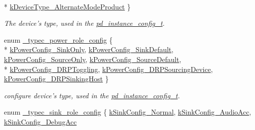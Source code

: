 \begin{DoxyCompactItemize}
\\*
\hyperlink{group__usb__pd__stack_gga922338772b41ceba51f7881c74b9e20aa529a07dcc02eddbe7318fb5d98d6d9a8}{k\-Device\-Type\-\_\-\-Alternate\-Mode\-Product}
 \}
\begin{DoxyCompactList}\small\item\em The device's type, used in the \hyperlink{group__usb__pd__stack_gafa6034f9e204836697da1f2fc996cbad}{pd\-\_\-instance\-\_\-config\-\_\-t}. \end{DoxyCompactList}\item 
enum \hyperlink{group__usb__pd__stack_gaffef947540aace08ecf6fd25f69720a9}{\-\_\-typec\-\_\-power\-\_\-role\-\_\-config} \{ \\*
\hyperlink{group__usb__pd__stack_ggaffef947540aace08ecf6fd25f69720a9a437645be6176b52731290288dfdb65de}{k\-Power\-Config\-\_\-\-Sink\-Only}, 
\hyperlink{group__usb__pd__stack_ggaffef947540aace08ecf6fd25f69720a9aff4b2380c8b265bbbe69d2eaa1ab207c}{k\-Power\-Config\-\_\-\-Sink\-Default}, 
\hyperlink{group__usb__pd__stack_ggaffef947540aace08ecf6fd25f69720a9a38da91c9c7115f0e6866a557601ad9b0}{k\-Power\-Config\-\_\-\-Source\-Only}, 
\hyperlink{group__usb__pd__stack_ggaffef947540aace08ecf6fd25f69720a9a9656266d9665fce5cad114863e549798}{k\-Power\-Config\-\_\-\-Source\-Default}, 
\\*
\hyperlink{group__usb__pd__stack_ggaffef947540aace08ecf6fd25f69720a9a9b59768282ea23a087cc0912e4516cae}{k\-Power\-Config\-\_\-\-D\-R\-P\-Toggling}, 
\hyperlink{group__usb__pd__stack_ggaffef947540aace08ecf6fd25f69720a9a2669bea019494464b15f2a4e4904d385}{k\-Power\-Config\-\_\-\-D\-R\-P\-Sourcing\-Device}, 
\hyperlink{group__usb__pd__stack_ggaffef947540aace08ecf6fd25f69720a9aba8782be77976d2ffc9830f1106e80f3}{k\-Power\-Config\-\_\-\-D\-R\-P\-Sinking\-Host}
 \}
\begin{DoxyCompactList}\small\item\em configure device's type, used in the \hyperlink{group__usb__pd__stack_gafa6034f9e204836697da1f2fc996cbad}{pd\-\_\-instance\-\_\-config\-\_\-t}. \end{DoxyCompactList}\item 
enum \hyperlink{group__usb__pd__stack_ga6ba6df5e492767ce7ac52bafddd8849d}{\-\_\-typec\-\_\-sink\-\_\-role\-\_\-config} \{ \hyperlink{group__usb__pd__stack_gga6ba6df5e492767ce7ac52bafddd8849da6fac5bc0fce029f255189bbe5182577e}{k\-Sink\-Config\-\_\-\-Normal}, 
\hyperlink{group__usb__pd__stack_gga6ba6df5e492767ce7ac52bafddd8849da3e1b93a81498672110b68655b71038d4}{k\-Sink\-Config\-\_\-\-Audio\-Acc}, 
\hyperlink{group__usb__pd__stack_gga6ba6df5e492767ce7ac52bafddd8849da870a709d39d5f94e62a5fc3e6872cb63}{k\-Sink\-Config\-\_\-\-Debug\-Acc}

\end{DoxyCompactItemize}
